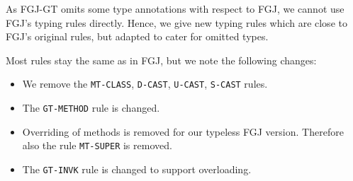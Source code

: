 As FGJ-GT omits some type annotations with respect to FGJ, we cannot use
FGJ's typing rules directly. Hence, we give new typing rules which are
close to FGJ's original rules, but adapted to cater for omitted types.



Most rules stay the same as in FGJ, but we note the following changes:
\begin{itemize}
\item We remove the \texttt{MT-CLASS}, \texttt{D-CAST}, \texttt{U-CAST}, \texttt{S-CAST} rules.
\item The \texttt{GT-METHOD} rule is changed.
\item Overriding of methods is removed for our typeless FGJ version. Therefore also the rule \texttt{MT-SUPER} is removed.
\item The \texttt{GT-INVK} rule is changed to support overloading.
\end{itemize}


